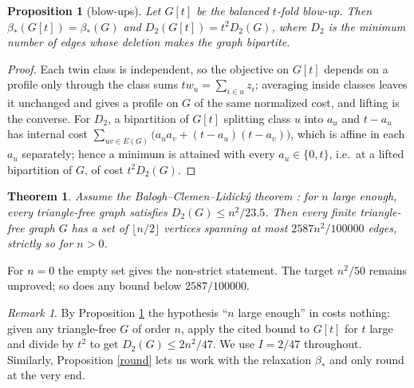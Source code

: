 \documentclass[11pt]{article}
\newtheorem{theorem}{Theorem}
\newtheorem{proposition}{Proposition}
\theoremstyle{remark}
\newtheorem{remark}{Remark}
\newcommand{\bh}{\beta_*}
\begin{document}
\begin{proposition}[blow-ups]\label{blow}
Let $G[t]$ be the balanced $t$-fold blow-up. Then $\bh(G[t])=\bh(G)$ and
$D_2(G[t])=t^2D_2(G)$, where $D_2$ is the minimum number of edges whose
deletion makes the graph bipartite.
\end{proposition}
\begin{proof}
Each twin class is independent, so the objective on $G[t]$ depends on a
profile only through the class sums $t w_u=\sum_{i\in u}z_i$; averaging inside
classes leaves it unchanged and gives a profile on $G$ of the same normalized
cost, and lifting is the converse. For $D_2$, a bipartition of $G[t]$ splitting
class $u$ into $a_u$ and $t-a_u$ has internal cost
$\sum_{uv\in E(G)}\big(a_ua_v+(t-a_u)(t-a_v)\big)$, which is affine in each
$a_u$ separately; hence a minimum is attained with every $a_u\in\{0,t\}$, i.e.\
at a lifted bipartition of $G$, of cost $t^2D_2(G)$.
\end{proof}

\begin{theorem}\label{main}
Assume the Balogh--Clemen--Lidick\'y theorem \cite[Theorem 2(a)]{bcl}: for
$n$ large enough, every triangle-free graph satisfies $D_2(G)\le n^2/23.5$.
Then every finite triangle-free graph $G$ has a set of $\lfloor n/2\rfloor$
vertices spanning at most $2587n^2/100000$ edges, strictly so for $n>0$.
\end{theorem}
\noindent For $n=0$ the empty set gives the non-strict statement. The target
$n^2/50$ remains unproved; so does any bound below $2587/100000$.

\begin{remark}
By Proposition \ref{blow} the hypothesis ``$n$ large enough'' in \cite{bcl}
costs nothing: given any triangle-free $G$ of order $n$, apply the cited bound
to $G[t]$ for $t$ large and divide by $t^2$ to get $D_2(G)\le 2n^2/47$. We use
$I=2/47$ throughout. Similarly, Proposition \ref{round} lets us work with the
relaxation $\bh$ and only round at the very end.
\end{remark}
\end{document}
